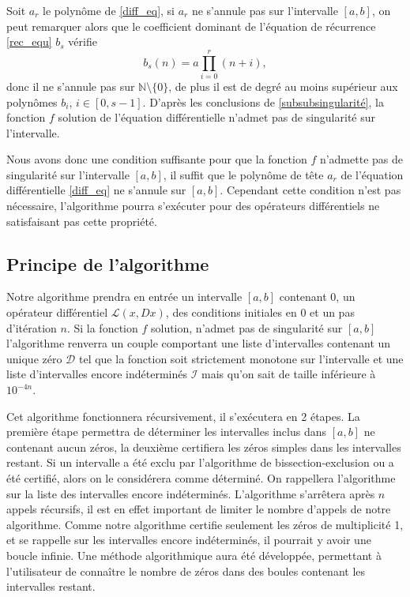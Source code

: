 \documentclass[a4paper,10pt]{article}
\begin{document}
	\begin{remarque}
		Soit $a_r$ le polynôme de \eqref{diff_eq}, si $a_r$ ne s'annule pas sur l'intervalle $[a,b]$, on peut remarquer alors que le coefficient dominant de l'équation de récurrence \eqref{rec_equ} $b_s$ vérifie
		\[b_s(n)=a\prod_{i=0}^{r}(n+i),\]
		donc il ne s'annule pas sur $\mathbb{N}\setminus\{0\}$, de plus il est de degré au moins supérieur aux polynômes $b_i$, $i \in [0,s-1]$. D'après les conclusions de \ref{subsubsingularité}, la fonction $f$ solution de l'équation différentielle n'admet pas de singularité sur l'intervalle.
	\end{remarque}
	
	Nous avons donc une condition suffisante pour que la fonction $f$ n'admette pas de singularité sur l'intervalle $[a,b]$, il suffit que le polynôme de tête $a_r$ de l'équation différentielle \eqref{diff_eq} ne s'annule sur $[a,b]$. Cependant cette condition n'est pas nécessaire, l'algorithme pourra s'exécuter pour des opérateurs différentiels ne satisfaisant pas cette propriété.
	
	
	\subsection{Principe de l'algorithme}
	
	Notre algorithme prendra en entrée un intervalle $[a,b]$ contenant $0$, un opérateur différentiel $\mathcal{L}(x,Dx)$, des conditions initiales en $0$ et un pas d'itération $n$. Si la fonction $f$ solution, n'admet pas de singularité sur $[a,b]$ l'algorithme renverra un couple comportant une liste d'intervalles contenant un unique zéro $\mathcal{D}$ tel que la fonction soit strictement monotone sur l'intervalle et une liste d'intervalles encore indéterminés $\mathcal{I}$ mais qu'on sait de taille inférieure à $10^{-4n}$.
	
	Cet algorithme fonctionnera récursivement, il s'exécutera en 2 étapes. La première étape permettra de déterminer les intervalles inclus dans $[a,b]$ ne contenant aucun zéros, la deuxième certifiera les zéros simples dans les intervalles restant. Si un intervalle a été exclu par l'algorithme de bissection-exclusion ou a été certifié, alors on le considérera comme déterminé. On rappellera l'algorithme sur la liste des intervalles encore indéterminés. L'algorithme s'arrêtera après $n$ appels récursifs, il est en effet important de limiter le nombre d'appels de notre algorithme. Comme notre algorithme certifie seulement les zéros de multiplicité 1, et se rappelle sur les intervalles encore indéterminés, il pourrait y avoir une boucle infinie.
	Une méthode algorithmique aura été développée, permettant à l'utilisateur de connaître le nombre de zéros dans des boules contenant les intervalles restant. 
	
\end{document}
